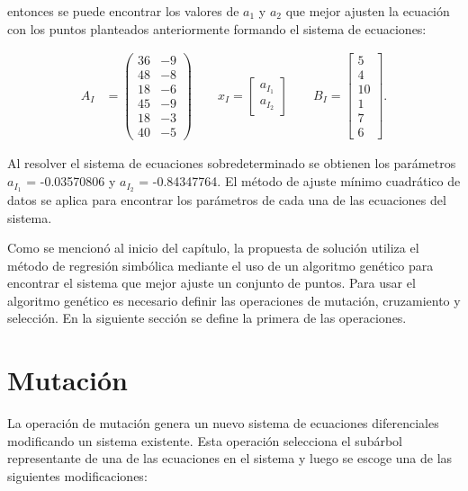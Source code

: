 entonces se puede encontrar los valores de $a_1$ y $a_2$ que mejor ajusten la ecuación con los puntos planteados anteriormente formando el sistema de ecuaciones:

\begin{align*}
    A_I & = \begin{pmatrix}
        36 & -9 \\
        48 & -8 \\
        18 & -6 \\
        45 & -9 \\
        18 & -3 \\
        40 & -5
    \end{pmatrix}
    \qquad
    x_I = \begin{bmatrix}
        a_{I_1} \\
        a_{I_2}
    \end{bmatrix}
    \qquad
    B_I = \begin{bmatrix}
        5  \\
        4  \\
        10 \\
        1  \\
        7  \\
        6
    \end{bmatrix}.
\end{align*}

Al resolver el sistema de ecuaciones sobredeterminado se obtienen los parámetros $a_{I_1}$ = -0.03570806 y $a_{I_2}$ = -0.84347764. El método de ajuste mínimo cuadrático de datos se aplica para encontrar los parámetros de cada una de las ecuaciones del sistema.

Como se mencionó al inicio del capítulo, la propuesta de solución utiliza el método de regresión simbólica mediante el uso de un algoritmo genético para encontrar el sistema que mejor ajuste un conjunto de puntos. Para usar el algoritmo genético es necesario definir las operaciones de mutación, cruzamiento y selección. En la siguiente sección se define la primera de las operaciones.

\section{Mutación}\label{section:mutation}

La operación de mutación genera un nuevo sistema de ecuaciones diferenciales modificando un sistema existente. Esta operación selecciona el subárbol representante de una de las ecuaciones en el sistema y luego se escoge una de las siguientes modificaciones:

